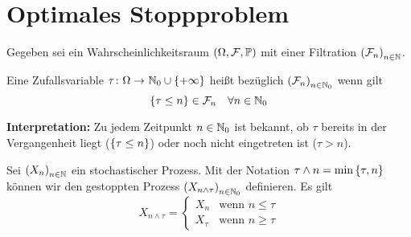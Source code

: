 \section{Optimales Stoppproblem}

Gegeben sei ein Wahrscheinlichkeitsraum $(\Omega, \mathcal{F}, \mathbb{P})$ mit einer Filtration $\left( \mathcal{F}_n \right)_{n \in \mathbb{N}}$.

\begin{*definition}
	Eine Zufallsvariable $\abb{\tau}{\Omega}{\N_0 \cup \menge{+\infty}}$ heißt  bezüglich $\left( \mathcal{F}_n \right)_{n \in \mathbb{N}_0}$ wenn gilt
	\begin{equation*}
		\left\{ \tau \le n \right\} \in \mathcal{F}_n \quad \forall n \in \mathbb{N}_0
	\end{equation*}
\end{*definition}

\textbf{Interpretation:} Zu jedem Zeitpunkt $n \in \mathbb{N}_0$ ist bekannt, ob $\tau$ bereits in der Vergangenheit liegt ($\left\{ \tau \le n \right\}$) oder noch nicht eingetreten ist ($\tau > n$).

Sei $\left( X_n \right)_{n \in \mathbb{N}}$ ein stochastischer Prozess. Mit der Notation $\tau \land n = \min\left\{ \tau, n \right\}$ können wir den gestoppten Prozess $\left( X_{n \land \tau} \right)_{n \in \mathbb{N}_0}$ definieren. Es gilt
\begin{equation*}
	X_{n \land \tau} = \begin{cases}
	X_n &\text{wenn } n \le \tau \\
	X_\tau &\text{wenn } n \ge \tau
	\end{cases}
\end{equation*}

